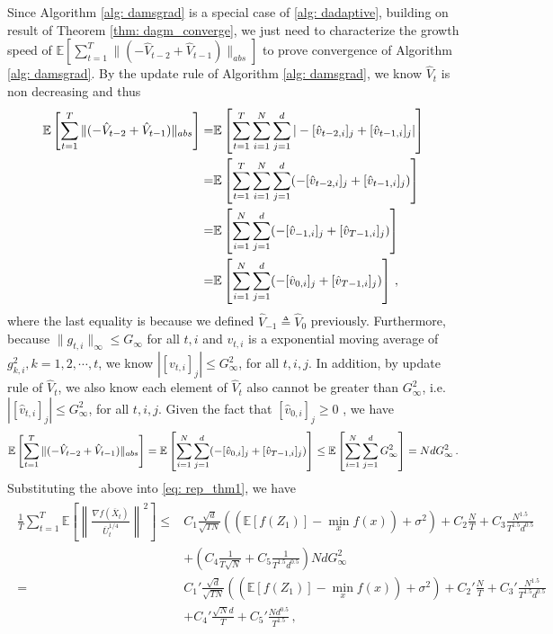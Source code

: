 \documentclass[anon,12pt]{colt2021} %
\begin{document}
Since Algorithm \ref{alg: damsgrad} is a special case of \ref{alg: dadaptive}, building on result of Theorem \ref{thm: dagm_converge}, we just need to characterize the growth speed of $\mathbb E \left[ \sum_{t=1}^{T}   \|    (- \hat V_{t-2} + \hat V_{t-1} ) \|_{abs} \right]  $ to prove convergence of Algorithm \ref{alg: damsgrad}.  By the update rule of Algorithm \ref{alg: damsgrad}, we know $\hat V_t$ is non decreasing and thus
\begin{align}\notag
\begin{split}
\mathbb E \left[ \sum_{t=1}^{T}   \|    (- \hat V_{t-2} + \hat V_{t-1} ) \|_{abs} \right] = &\mathbb E \left[ \sum_{t=1}^{T}  \sum_{i=1}^N \sum_{j=1}^d    |- [\hat v_{t-2,i}]_j + [\hat v_{t-1,i}]_j | \right]    \\
= &\mathbb E \left[ \sum_{t=1}^{T}  \sum_{i=1}^N \sum_{j=1}^d    (- [\hat v_{t-2,i}]_j + [\hat v_{t-1,i}]_j ) \right]    \\
= &\mathbb E \left[   \sum_{i=1}^N \sum_{j=1}^d    (- [\hat v_{-1,i}]_j + [\hat v_{T-1,i}]_j ) \right]    \\
= &\mathbb E \left[   \sum_{i=1}^N \sum_{j=1}^d    (- [\hat v_{0,i}]_j + [\hat v_{T-1,i}]_j ) \right] \, ,  \\
\end{split}
\end{align}
where the last equality is because  we defined $\hat V_{-1} \triangleq \hat V_0$  previously.
Furthermore, because $\|g_{t,i}\|_{\infty} \leq G_{\infty}$ for all $t,i$ and $v_{t,i}$ is a exponential moving average of $g_{k,i}^2, k=1,2,\cdots,t$, we know $|[v_{t,i}]_j| \leq G^2_{\infty}$, for all $t,i,j$. In addition, by update rule of $\hat V_t$, we also know each element of $\hat V_{t}$ also cannot be greater than $G^2_{\infty}$, i.e. $|[\hat v_{t,i}]_j| \leq G^2_{\infty}$, for all $t,i,j$. 
Given the fact that $[\hat v_{0,i}]_j \geq 0$ , we have 
\begin{align}\notag
\mathbb E \left[ \sum_{t=1}^{T}   \|    (- \hat V_{t-2} + \hat V_{t-1} ) \|_{abs} \right]  = \mathbb E \left[   \sum_{i=1}^N \sum_{j=1}^d    (- [\hat v_{0,i}]_j + [\hat v_{T-1,i}]_j ) \right]  
\leq  \mathbb E \left[   \sum_{i=1}^N \sum_{j=1}^d  G_{\infty}^2   \right] =  Nd G_{\infty}^2 \, .
\end{align}
Substituting the above into \eqref{eq: rep_thm1}, we have 
\begin{align}\label{eq: sub_thm1}
\begin{split}
	 \frac{1}{T}\sum_{t=1}^T  \mathbb E \left [\left\|\frac{\nabla f( \overline X_{t})}{\overline U_{t}^{1/4}}\right\|^2  \right] 
	\leq  & C_1 \frac{\sqrt{d}}{\sqrt{TN}} \left(( \mathbb E  [f( Z_{1})]  -  \min_x  f(x)) +    \sigma^2 \right)  +  C_2 \frac{N}{T}  +  C_3 \frac{N^{1.5}}{T^{1.5}d^{0.5}} 
	 \\
    &+  \left(C_4 \frac{1}{T\sqrt{N}} +  C_5   \frac{1}{T^{1.5}d^{0.5}}\right)NdG_{\infty}^2 \\
    =  & C_1' \frac{\sqrt{d}}{\sqrt{TN}} \left(( \mathbb E  [f( Z_{1})]  -  \min_x  f(x)) +    \sigma^2 \right)  +  C_2' \frac{N}{T}  +  C_3' \frac{N^{1.5}}{T^{1.5}d^{0.5}} 
	 \\
    &+  C_4' \frac{\sqrt{N}d}{T} +  C_5'  \frac{Nd^{0.5}}{T^{1.5}}\,,
\end{split}
\end{align}
\end{document}
